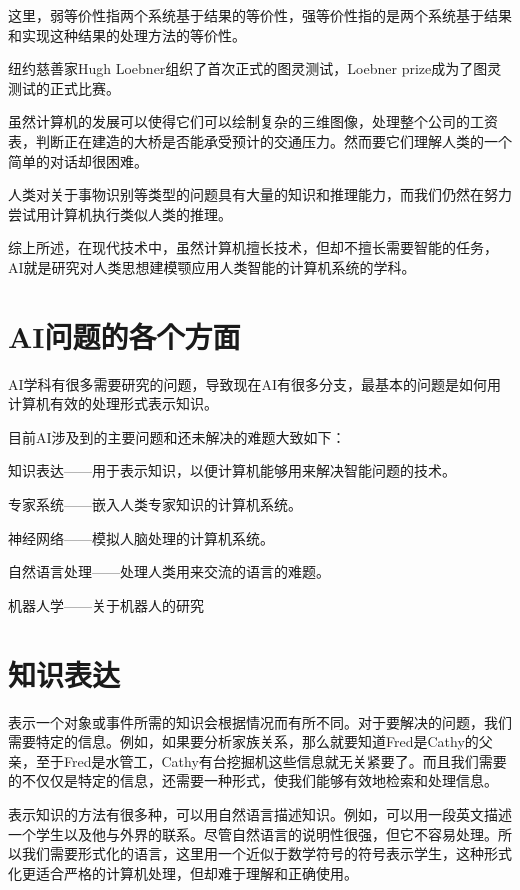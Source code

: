这里，弱等价性指两个系统基于结果的等价性，强等价性指的是两个系统基于结果和实现这种结果的处理方法的等价性。

纽约慈善家Hugh Loebner组织了首次正式的图灵测试，Loebner prize成为了图灵测试的正式比赛。

虽然计算机的发展可以使得它们可以绘制复杂的三维图像，处理整个公司的工资表，判断正在建造的大桥是否能承受预计的交通压力。然而要它们理解人类的一个简单的对话却很困难。

人类对关于事物识别等类型的问题具有大量的知识和推理能力，而我们仍然在努力尝试用计算机执行类似人类的推理。

综上所述，在现代技术中，虽然计算机擅长技术，但却不擅长需要智能的任务，AI就是研究对人类思想建模颚应用人类智能的计算机系统的学科。

\section{AI问题的各个方面}



AI学科有很多需要研究的问题，导致现在AI有很多分支，最基本的问题是如何用计算机有效的处理形式表示知识。

目前AI涉及到的主要问题和还未解决的难题大致如下：

\begin{compactitem}
\item 知识表达——用于表示知识，以便计算机能够用来解决智能问题的技术。
\item 专家系统——嵌入人类专家知识的计算机系统。
\item 神经网络——模拟人脑处理的计算机系统。
\item 自然语言处理——处理人类用来交流的语言的难题。
\item 机器人学——关于机器人的研究
\end{compactitem}


\section{知识表达}


表示一个对象或事件所需的知识会根据情况而有所不同。对于要解决的问题，我们需要特定的信息。例如，如果要分析家族关系，那么就要知道Fred是Cathy的父亲，至于Fred是水管工，Cathy有台挖掘机这些信息就无关紧要了。而且我们需要的不仅仅是特定的信息，还需要一种形式，使我们能够有效地检索和处理信息。

表示知识的方法有很多种，可以用自然语言描述知识。例如，可以用一段英文描述一个学生以及他与外界的联系。尽管自然语言的说明性很强，但它不容易处理。所以我们需要形式化的语言，这里用一个近似于数学符号的符号表示学生，这种形式化更适合严格的计算机处理，但却难于理解和正确使用。

